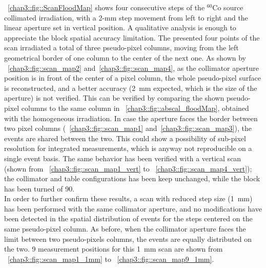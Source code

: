 \figurename~\ref{chap3::fig::ScanFloodMap} shows four consecutive steps of the $^{60}$Co source collimated irradiation, with a 2-mm step movement from left to right and the linear aperture set in vertical position. A qualitative analysis is enough to appreciate the block spatial accuracy limitation. The presented four points of the scan irradiated a total of three pseudo-pixel columns, moving from the left geometrical border of one column to the center of the next one. As shown by \figurename~\ref{chap3::fig::scan_map2} and~\ref{chap3::fig::scan_map4}, as the collimator aperture position is in front of the center of a pixel column, the whole pseudo-pixel surface is reconstructed, and a better accuracy (2~mm expected, which is the size of the aperture) is not verified. This can be verified by comparing the shown pseudo-pixel columns to the same column in \figurename~\ref{chap3::fig::abscal_floodMap}, obtained with the homogeneous irradiation. In case the aperture faces the border between two pixel columns (\figurename~\ref{chap3::fig::scan_map1} and~\ref{chap3::fig::scan_map3}), the events are shared between the two. This could show a possibility of sub-pixel resolution for integrated measurements, which is anyway not reproducible on a single event basis. The same behavior has been verified with a vertical scan (shown from \figurename~\ref{chap3::fig::scan_map1_vert} to \figurename~\ref{chap3::fig::scan_map4_vert}); the collimator and table configurations has been keep unchanged, while the block has been turned of 90\textdegree.\\ 
In order to further confirm these results, a scan with reduced step size (1~mm) has been performed with the same collimator aperture, and no modifications have been detected in the spatial distribution of events for the steps centered on the same pseudo-pixel column. As before, when the collimator aperture faces the limit between two pseudo-pixels columns, the events are equally distributed on the two. 9 measurement positions for this 1~mm scan are shown from \figurename~\ref{chap3::fig::scan_map1_1mm} to \figurename~\ref{chap3::fig::scan_map9_1mm}.\\ 

